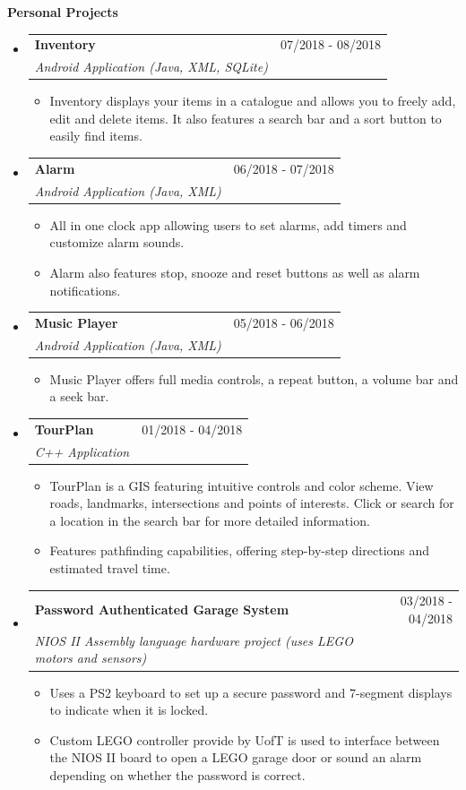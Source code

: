 \documentclass[letterpaper,11pt]{article}
\makeatletter
\newcommand{\resitem}[1]{\item #1 \vspace{-2pt}}
\newcommand{\resheading}[1]{{\large \colorbox{mygrey}{\begin{minipage}{\textwidth}{\textbf{#1 \vphantom{p\^{E}}}}\end{minipage}}}}
\newcommand{\ressubheading}[4]{
\begin{tabular*}{7.0in}{l@{\extracolsep{\fill}}r}
		\textbf{#1} & #2 \\
		\textit{#3} & \textit{#4} \\
\end{tabular*}\vspace{-6pt}}
\makeatother
\begin{document}

\resheading{Personal Projects}

\begin{itemize}
    \item
    \ressubheading{Inventory}{07/2018 - 08/2018}{Android Application (Java, XML, SQLite)}{}
    \begin{itemize}
        \resitem{Inventory displays your items in a catalogue and allows you to freely add, edit and delete items. It also features a search bar and a sort button to easily find items.}
    \end{itemize}
    
    \item
    \ressubheading{Alarm}{06/2018 - 07/2018}{Android Application (Java, XML)}{}
    \begin{itemize}
        \resitem{All in one clock app allowing users to set alarms, add timers and customize alarm sounds.}
        \resitem{Alarm also features stop, snooze and reset buttons as well as alarm notifications.}
    \end{itemize}
 
 	\item
    \ressubheading{Music Player}{05/2018 - 06/2018}{Android Application (Java, XML)}{}
    \begin{itemize}
        \resitem{Music Player offers full media controls, a repeat button, a volume bar and a seek bar.}
    \end{itemize}
  
    \item
      \ressubheading{TourPlan}{01/2018 - 04/2018}{C++ Application}{}
      \begin{itemize}
          \resitem{TourPlan is a GIS featuring intuitive controls and color scheme. View roads, landmarks, intersections and points of interests. Click or search for a location in the search bar for more detailed information.}
          \resitem{Features pathfinding capabilities, offering step-by-step directions and estimated travel time.}
      \end{itemize}
      
    \item
      \ressubheading{Password Authenticated Garage System}{03/2018 - 04/2018}		{NIOS II Assembly language hardware project (uses LEGO motors and sensors)}{}
      \begin{itemize}
          \resitem{Uses a PS2 keyboard to set up a secure password and 7-segment displays to indicate when it is locked.}
          \resitem{Custom LEGO controller provide by UofT is used to interface between the NIOS II board to open a LEGO garage door or sound an alarm depending on whether the password is correct.}
      \end{itemize}  
  

\end{itemize}
\end{document}
